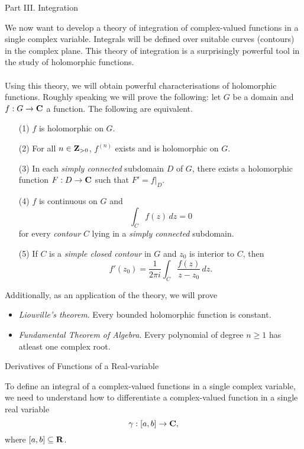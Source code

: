 \vspace*{2em}

\begin{mdframed}[backgroundcolor=paleyellow,linewidth=1pt]
\begin{center}
{\sc\Large Part III. Integration}
\end{center}
\end{mdframed}
We now want to develop a theory of integration of complex-valued functions in a single complex variable. Integrals will be defined over suitable curves (contours) in the complex plane. This theory of integration is a surprisingly powerful tool in the study of holomorphic functions.\\
\\
Using this theory, we will obtain powerful characterisations of holomorphic functions. Roughly speaking we will prove the following: let $G$ be a domain and $f:G \to \mathbf C$ a function. The following are equivalent. 
\begin{itemize}
\item[(1)] $f$ is holomorphic on $G$.
\item[(2)] For all $n \in \mathbf Z_{>0}$, $f^{(n)}$ exists and is holomorphic on $G$.
\item[(3)] In each \emph{simply connected} subdomain $D$ of $G$, there exists a holomorphic function $F:D \to \mathbf C$ such that $F' = f\vert_D$. 
\item[(4)] $f$ is continuous on $G$ and 
\[\int_C f(z)\,dz = 0\]
for every \emph{contour} $C$ lying in a \emph{simply connected} subdomain.
\item[(5)] If $C$ is a \emph{simple closed contour} in $G$ and $z_0$ is interior to $C$, then
\[f'(z_0) = \frac{1}{2\pi i}\int_C \frac{f(z)}{z - z_0}\,dz.\]
\end{itemize}
Additionally, as an application of the theory, we will prove
\begin{itemize}
\item \emph{Liouville's theorem}. Every bounded holomorphic function is constant.
\item \emph{Fundamental Theorem of Algebra}. Every polynomial of degree $n \geq 1$ has atleast one complex root.
\end{itemize}

\vspace*{1em}

\begin{mdframed}
\begin{center}
{\Large Derivatives of Functions of a Real-variable}
\end{center}
\end{mdframed}
To define an integral of a complex-valued functions in a single complex variable, we need to understand how to differentiate a complex-valued function in a single real variable
\[\gamma: [a,b] \to \mathbf C,\]
where $[a,b] \subseteq \mathbf R$.

